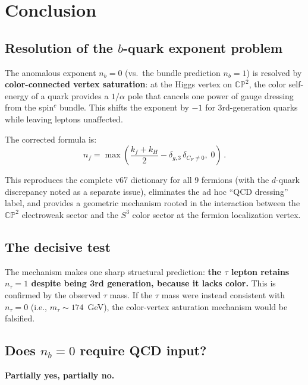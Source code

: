 \documentclass[11pt,a4paper]{article}
\newcommand{\CP}{\mathbb{CP}}
\theoremstyle{definition}
\theoremstyle{remark}
\begin{document}
\section{Conclusion}
\label{sec:conclusion}

\subsection{Resolution of the $b$-quark exponent problem}

The anomalous exponent $n_b = 0$ (vs.\ the bundle prediction $n_b = 1$) is
resolved by \textbf{color-connected vertex saturation}: at the Higgs vertex
on $\CP^2$, the color self-energy of a quark provides a $1/\alpha$ pole that
cancels one power of gauge dressing from the spin$^c$ bundle.  This shifts the
exponent by $-1$ for 3rd-generation quarks while leaving leptons unaffected.

The corrected formula is:
\begin{equation}
n_f = \max\!\left(\frac{k_f + k_H}{2}
  - \delta_{g,3}\,\delta_{C_F \neq 0},\; 0\right)\,.
\end{equation}

This reproduces the complete v67 dictionary for all 9 fermions (with the
$d$-quark discrepancy noted as a separate issue), eliminates the ad hoc
``QCD dressing'' label, and provides a geometric mechanism rooted in the
interaction between the $\CP^2$ electroweak sector and the $S^3$ color
sector at the fermion localization vertex.

\subsection{The decisive test}

The mechanism makes one sharp structural prediction: \textbf{the $\tau$
lepton retains $n_\tau = 1$ despite being 3rd generation, because it lacks
color.}  This is confirmed by the observed $\tau$ mass.  If the $\tau$ mass
were instead consistent with $n_\tau = 0$ (i.e., $m_\tau \sim 174$~GeV),
the color-vertex saturation mechanism would be falsified.

\subsection{Does $n_b = 0$ require QCD input?}

\textbf{Partially yes, partially no.}
\end{document}
